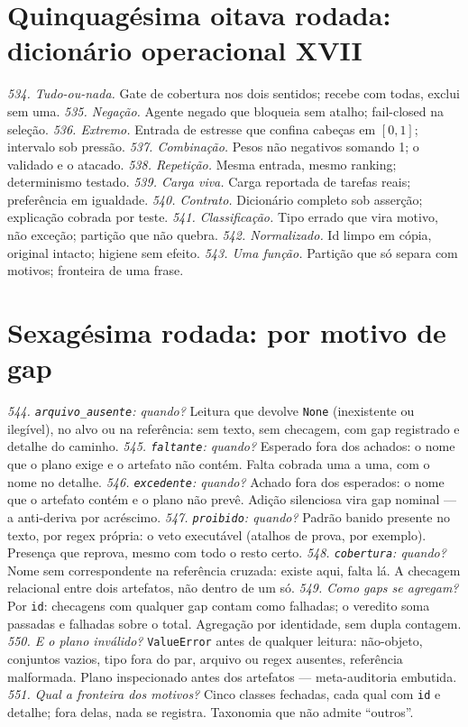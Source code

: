 \section{Quinquagésima oitava rodada: dicionário operacional XVII}
\textit{534. Tudo-ou-nada.} Gate de cobertura nos dois sentidos; recebe com todas, exclui sem uma.
\textit{535. Negação.} Agente negado que bloqueia sem atalho; fail-closed na seleção.
\textit{536. Extremo.} Entrada de estresse que confina cabeças em $[0,1]$; intervalo sob pressão.
\textit{537. Combinação.} Pesos não negativos somando 1; o validado e o atacado.
\textit{538. Repetição.} Mesma entrada, mesmo ranking; determinismo testado.
\textit{539. Carga viva.} Carga reportada de tarefas reais; preferência em igualdade.
\textit{540. Contrato.} Dicionário completo sob asserção; explicação cobrada por teste.
\textit{541. Classificação.} Tipo errado que vira motivo, não exceção; partição que não quebra.
\textit{542. Normalizado.} Id limpo em cópia, original intacto; higiene sem efeito.
\textit{543. Uma função.} Partição que só separa com motivos; fronteira de uma frase.
\section{Sexagésima rodada: por motivo de gap}
\textit{544. \texttt{arquivo\_ausente}: quando?} Leitura que devolve \texttt{None} (inexistente ou ilegível), no alvo ou na referência: sem texto, sem checagem, com gap registrado e detalhe do caminho.
\textit{545. \texttt{faltante}: quando?} Esperado fora dos achados: o nome que o plano exige e o artefato não contém. Falta cobrada uma a uma, com o nome no detalhe.
\textit{546. \texttt{excedente}: quando?} Achado fora dos esperados: o nome que o artefato contém e o plano não prevê. Adição silenciosa vira gap nominal --- a anti-deriva por acréscimo.
\textit{547. \texttt{proibido}: quando?} Padrão banido presente no texto, por regex própria: o veto executável (atalhos de prova, por exemplo). Presença que reprova, mesmo com todo o resto certo.
\textit{548. \texttt{cobertura}: quando?} Nome sem correspondente na referência cruzada: existe aqui, falta lá. A checagem relacional entre dois artefatos, não dentro de um só.
\textit{549. Como gaps se agregam?} Por \texttt{id}: checagens com qualquer gap contam como falhadas; o veredito soma passadas e falhadas sobre o total. Agregação por identidade, sem dupla contagem.
\textit{550. E o plano inválido?} \texttt{ValueError} antes de qualquer leitura: não-objeto, conjuntos vazios, tipo fora do par, arquivo ou regex ausentes, referência malformada. Plano inspecionado antes dos artefatos --- meta-auditoria embutida.
\textit{551. Qual a fronteira dos motivos?} Cinco classes fechadas, cada qual com \texttt{id} e detalhe; fora delas, nada se registra. Taxonomia que não admite ``outros''.
